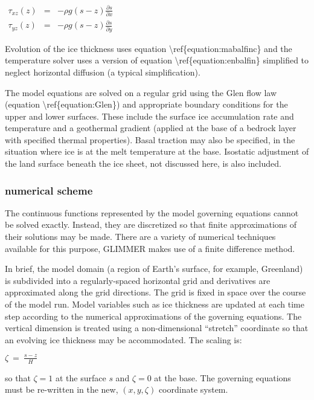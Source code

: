 $\begin{matrix}
\tau_{xz}(z)&=&-\rho g \left(s - z \right) \frac{\partial s}{\partial x}  \\
\tau_{yz}(z)&=&-\rho g \left(s - z \right) \frac{\partial s}{\partial y}
\end{matrix}$

Evolution of the ice thickness uses equation
\textbackslash{}ref\{equation:mabalfinc\} and the temperature solver
uses a version of equation \textbackslash{}ref\{equation:enbalfin\}
simplified to neglect horizontal diffusion (a typical simplification).

The model equations are solved on a regular grid using the Glen flow law
(equation \textbackslash{}ref\{equation:Glen\}) and appropriate boundary
conditions for the upper and lower surfaces. These include the surface
ice accumulation rate and temperature and a geothermal gradient (applied
at the base of a bedrock layer with specified thermal properties). Basal
traction may also be specified, in the situation where ice is at the
melt temperature at the base. Isostatic adjustment of the land surface
beneath the ice sheet, not discussed here, is also included.

\subsubsection{numerical scheme}

The continuous functions represented by the model governing equations
cannot be solved exactly. Instead, they are discretized so that finite
approximations of their solutions may be made. There are a variety of
numerical techniques available for this purpose, GLIMMER makes use of a
finite difference method.

In brief, the model domain (a region of Earth's surface, for example,
Greenland) is subdivided into a regularly-spaced horizontal grid and
derivatives are approximated along the grid directions. The grid is
fixed in space over the course of the model run. Model variables such as
ice thickness are updated at each time step according to the numerical
approximations of the governing equations. The vertical dimension is
treated using a non-dimensional ``stretch'' coordinate so that an
evolving ice thickness may be accommodated. The scaling is:

$
\zeta~=~\frac{s-z}{H}
$

so that $\zeta=1$ at the surface $s$ and $\zeta=0$ at the base. The
governing equations must be re-written in the new, $(x, y, \zeta)$
coordinate system.

